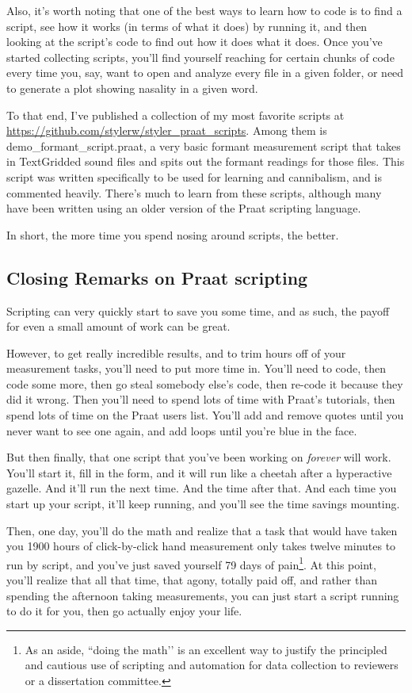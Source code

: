 Also, it's worth noting that one of the best ways to learn how to code
is to find a script, see how it works (in terms of what it does) by
running it, and then looking at the script's code to find out how it
does what it does. Once you've started collecting scripts, you'll find
yourself reaching for certain chunks of code every time you, say, want
to open and analyze every file in a given folder, or need to generate a
plot showing nasality in a given word.

To that end, I've published a collection of my most favorite scripts at
\url{https://github.com/stylerw/styler_praat_scripts}. Among them is
demo\_formant\_script.praat, a very basic formant measurement script
that takes in TextGridded sound files and spits out the formant readings
for those files. This script was written specifically to be used for
learning and cannibalism, and is commented heavily. There's much to
learn from these scripts, although many have been written using an older
version of the Praat scripting language.

In short, the more time you spend nosing around scripts, the better.

\hypertarget{closing-remarks-on-praat-scripting}{%
\subsection{Closing Remarks on Praat
scripting}\label{closing-remarks-on-praat-scripting}}

Scripting can very quickly start to save you some time, and as such, the
payoff for even a small amount of work can be great.

However, to get really incredible results, and to trim hours off of your
measurement tasks, you'll need to put more time in. You'll need to code,
then code some more, then go steal somebody else's code, then re-code it
because they did it wrong. Then you'll need to spend lots of time with
Praat's tutorials, then spend lots of time on the Praat users list.
You'll add and remove quotes until you never want to see one again, and
add loops until you're blue in the face.

But then finally, that one script that you've been working on
\emph{forever} will work. You'll start it, fill in the form, and it will
run like a cheetah after a hyperactive gazelle. And it'll run the next
time. And the time after that. And each time you start up your script,
it'll keep running, and you'll see the time savings mounting.

Then, one day, you'll do the math and realize that a task that would
have taken you 1900 hours of click-by-click hand measurement only takes
twelve minutes to run by script, and you've just saved yourself 79 days
of
pain\footnote{As an aside, ``doing the math’’ is an excellent way to justify the principled and cautious use of scripting and automation for data collection to reviewers or a dissertation committee.}.
At this point, you'll realize that all that time, that agony, totally
paid off, and rather than spending the afternoon taking measurements,
you can just start a script running to do it for you, then go actually
enjoy your life.

